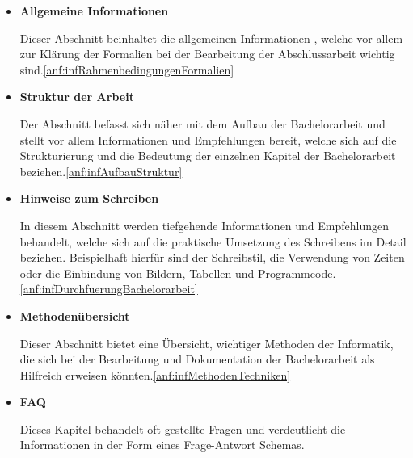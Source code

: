 \documentclass{scrreprt}
\begin{document}
\begin{itemize}
\item \textbf{Allgemeine Informationen}
\par Dieser Abschnitt beinhaltet die allgemeinen Informationen , welche vor allem zur Klärung der Formalien bei der Bearbeitung der Abschlussarbeit wichtig sind.\ref{anf:infRahmenbedingungenFormalien}

\item \textbf{Struktur der Arbeit}
\par Der Abschnitt befasst sich näher mit dem Aufbau der Bachelorarbeit und stellt vor allem Informationen und Empfehlungen bereit, welche sich auf die Strukturierung und die Bedeutung der einzelnen Kapitel der Bachelorarbeit beziehen.\ref{anf:infAufbauStruktur}

\item \textbf{Hinweise zum Schreiben}
\par In diesem Abschnitt werden tiefgehende Informationen und Empfehlungen behandelt, welche sich auf die praktische Umsetzung des Schreibens im Detail beziehen. Beispielhaft hierfür sind der Schreibstil, die Verwendung von Zeiten oder die Einbindung von Bildern, Tabellen und Programmcode.\ref{anf:infDurchfuerungBachelorarbeit}

\item \textbf{Methodenübersicht}
\par Dieser Abschnitt bietet eine Übersicht, wichtiger Methoden der Informatik, die sich bei der Bearbeitung und Dokumentation der Bachelorarbeit als Hilfreich erweisen könnten.\ref{anf:infMethodenTechniken}

\item \textbf{FAQ}
\par Dieses Kapitel behandelt oft gestellte Fragen und verdeutlicht die Informationen in der Form eines Frage-Antwort Schemas.
\end{itemize}
\end{document}
